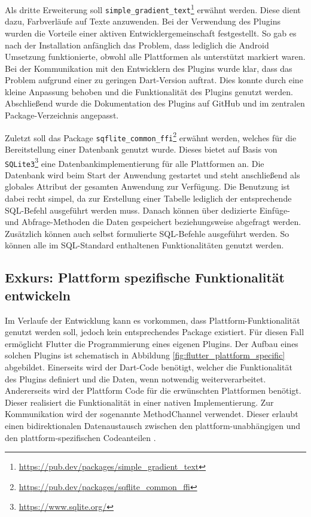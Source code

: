 Als dritte Erweiterung soll \verb|simple_gradient_text|\footnote{\url{https://pub.dev/packages/simple\_gradient\_text}} erwähnt werden. Diese dient dazu, Farbverläufe auf Texte anzuwenden. Bei der Verwendung des Plugins wurden die Vorteile einer aktiven Entwicklergemeinschaft festgestellt. So gab es nach der Installation anfänglich das Problem, dass lediglich die Android Umsetzung funktionierte, obwohl alle Plattformen als unterstützt markiert waren. Bei der Kommunikation mit den Entwicklern des Plugins wurde klar, dass das Problem aufgrund einer zu geringen Dart-Version auftrat. Dies konnte durch eine kleine Anpassung behoben und die Funktionalität des Plugins genutzt werden. Abschließend wurde die Dokumentation des Plugins auf GitHub und im zentralen Package-Verzeichnis angepasst.

Zuletzt soll das Package \verb|sqflite_common_ffi|\footnote{\url{https://pub.dev/packages/sqflite\_common\_ffi}} erwähnt werden, welches für die Bereitstellung einer Datenbank genutzt wurde. Dieses bietet auf Basis von \verb|SQLite3|\footnote{\url{https://www.sqlite.org/}} eine Datenbankimplementierung für alle Plattformen an.
Die Datenbank wird beim Start der Anwendung gestartet und steht anschließend als globales Attribut der gesamten Anwendung zur Verfügung.
Die Benutzung ist dabei recht simpel, da zur Erstellung einer Tabelle lediglich der entsprechende SQL-Befehl ausgeführt werden muss.
Danach können über dedizierte Einfüge- und Abfrage-Methoden die Daten gespeichert beziehungsweise abgefragt werden.
Zusätzlich können auch selbst formulierte SQL-Befehle ausgeführt werden. So können alle im SQL-Standard enthaltenen Funktionalitäten genutzt werden.


\subsection{Exkurs: Plattform spezifische Funktionalität entwickeln}
Im Verlaufe der Entwicklung kann es vorkommen, dass Plattform-Funktionalität genutzt werden soll, jedoch kein entsprechendes Package existiert.
Für diesen Fall ermöglicht Flutter die Programmierung eines eigenen Plugins.
Der Aufbau eines solchen Plugins ist schematisch in Abbildung \ref{fig:flutter_plattform_specific} abgebildet. 
Einerseits wird der Dart-Code benötigt, welcher die Funktionalität des Plugins definiert und die Daten, wenn notwendig weiterverarbeitet. 
Andererseits wird der Plattform Code für die erwünschten Plattformen benötigt. Dieser realisiert die Funktionalität in einer nativen Implementierung.
Zur Kommunikation wird der sogenannte MethodChannel verwendet. Dieser erlaubt einen bidirektionalen Datenaustausch zwischen den plattform-unabhängigen und den plattform-spezifischen Codeanteilen \cite[Kapitel~12.3]{Flutter_Recipes}.

